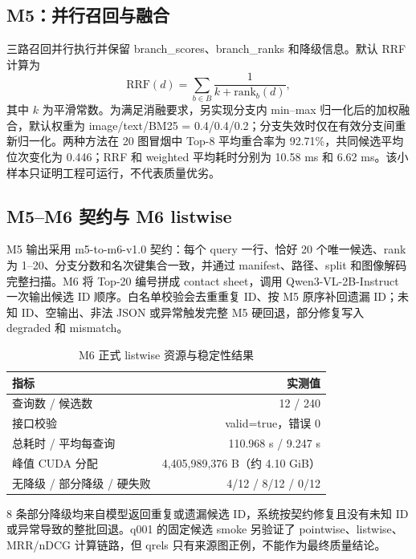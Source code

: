 \documentclass[UTF8,11pt,a4paper]{ctexart}
\begin{document}
\subsection{M5：并行召回与融合}
三路召回并行执行并保留 branch\_scores、branch\_ranks 和降级信息。默认 RRF 计算为
\[
\mathrm{RRF}(d)=\sum_{b\in B}\frac{1}{k+\mathrm{rank}_b(d)},
\]
其中 $k$ 为平滑常数。为满足消融要求，另实现分支内 min--max 归一化后的加权融合，默认权重为 image/text/BM25 = 0.4/0.4/0.2；分支失效时仅在有效分支间重新归一化。两种方法在 20 图冒烟中 Top-8 平均重合率为 92.71\%，共同候选平均位次变化为 0.446；RRF 和 weighted 平均耗时分别为 10.58 ms 和 6.62 ms。该小样本只证明工程可运行，不代表质量优劣。
\subsection{M5--M6 契约与 M6 listwise}
M5 输出采用 m5-to-m6-v1.0 契约：每个 query 一行、恰好 20 个唯一候选、rank 为 1--20、分支分数和名次键集合一致，并通过 manifest、路径、split 和图像解码完整扫描。M6 将 Top-20 编号拼成 contact sheet，调用 Qwen3-VL-2B-Instruct 一次输出候选 ID 顺序。白名单校验会去重重复 ID、按 M5 原序补回遗漏 ID；未知 ID、空输出、非法 JSON 或异常触发完整 M5 硬回退，部分修复写入 degraded 和 mismatch。
\begin{table}[H]\centering\small\caption{M6 正式 listwise 资源与稳定性结果}\begin{tabular}{l r}\toprule 指标 & 实测值\\\midrule 查询数 / 候选数 & 12 / 240\\接口校验 & valid=true，错误 0\\总耗时 / 平均每查询 & 110.968 s / 9.247 s\\峰值 CUDA 分配 & 4,405,989,376 B（约 4.10 GiB）\\无降级 / 部分降级 / 硬失败 & 4/12 / 8/12 / 0/12\\\bottomrule\end{tabular}\end{table}
8 条部分降级均来自模型返回重复或遗漏候选 ID，系统按契约修复且没有未知 ID 或异常导致的整批回退。q001 的固定候选 smoke 另验证了 pointwise、listwise、MRR/nDCG 计算链路，但 qrels 只有来源图正例，不能作为最终质量结论。
\end{document}
